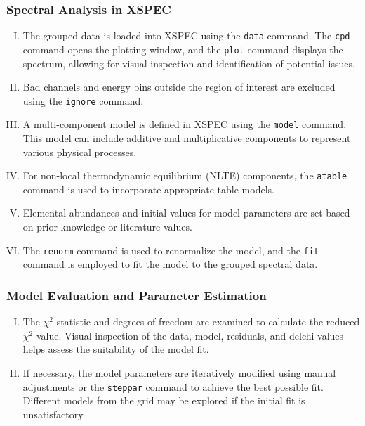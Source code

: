 			\subsubsection{Spectral Analysis in XSPEC}
				\begin{enumerate}[I.]
					\item The grouped data is loaded into XSPEC using the \texttt{data} command. The \texttt{cpd} command opens the plotting window, and the \texttt{plot} command displays the spectrum, allowing for visual inspection and identification of potential issues.
					\item Bad channels and energy bins outside the region of interest are excluded using the \texttt{ignore} command.
					\item A multi-component model is defined in XSPEC using the \texttt{model} command. This model can include additive and multiplicative components to represent various physical processes.
					\item For non-local thermodynamic equilibrium (NLTE) components, the \texttt{atable} command is used to incorporate appropriate table models.
					\item Elemental abundances and initial values for model parameters are set based on prior knowledge or literature values.
					\item The \texttt{renorm} command is used to renormalize the model, and the \texttt{fit} command is employed to fit the model to the grouped spectral data.
				\end{enumerate}
			
			\subsubsection{Model Evaluation and Parameter Estimation}
				\begin{enumerate}[I.]
					\item The $\chi^2$ statistic and degrees of freedom are examined to calculate the reduced $\chi^2$ value. Visual inspection of the data, model, residuals, and delchi values helps assess the suitability of the model fit.
					\item If necessary, the model parameters are iteratively modified using manual adjustments or the \texttt{steppar} command to achieve the best possible fit. Different models from the grid may be explored if the initial fit is unsatisfactory.
				\end{enumerate}
			
